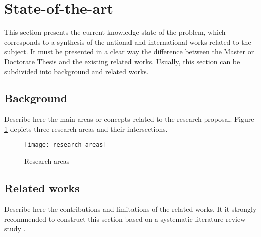 \section{State-of-the-art}
\label{sec:state_of_the_art}

This section presents the current knowledge state of the problem, which corresponds to a synthesis of the national and international works related to the subject. It must be presented in a clear way the difference between the Master or Doctorate Thesis and the existing related works. Usually, this section can be subdivided into background and related works.

\subsection{Background}
\label{sub:background}

Describe here the main areas or concepts related to the research proposal. Figure \ref{fig:research_areas} depicts three research areas and their intersections.

\begin{figure}[!ht]
    \centering
    \texttt{[image: research\_areas]}
    \caption{Research areas}
    \label{fig:research_areas}
\end{figure}


\subsection{Related works}
\label{sub:related_work}

Describe here the contributions and limitations of the related works. It it strongly recommended to construct this section based on a systematic literature review study \cite{kitchenham_2007:systematic_review}.
